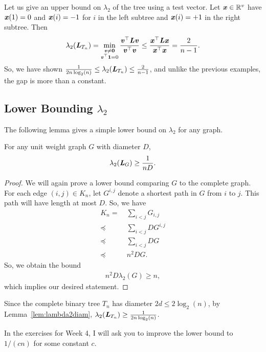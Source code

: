 Let us give an upper bound on $\lambda_2$ of the tree using a test vector.
Let $\boldsymbol{\mathit{x}} \in \mathbb{R}^v$ have $\boldsymbol{\mathit{x}}(1) = 0$ and $\boldsymbol{\mathit{x}}(i) = -1$ for $i$ in the left
subtree and $\boldsymbol{\mathit{x}}(i) = +1$ in the right subtree.
Then
\begin{align*}
\lambda_2(\boldsymbol{\mathit{L}}_{T_n}) = \min_{ \substack{ \boldsymbol{\mathit{v}} \neq \boldsymbol{0} \\ \boldsymbol{\mathit{v}}^\top
  \boldsymbol{1} = 0} } \frac{ \boldsymbol{\mathit{v}}^\top \boldsymbol{\mathit{L}} \boldsymbol{\mathit{v}}}{ \boldsymbol{\mathit{v}}^\top \boldsymbol{\mathit{v}}}
  \leq
  \frac{ \boldsymbol{\mathit{x}}^\top \boldsymbol{\mathit{L}} \boldsymbol{\mathit{x}}}{ \boldsymbol{\mathit{x}}^\top \boldsymbol{\mathit{x}}}
  =
  \frac{2}{n-1}.
\end{align*}
So, we have shown
$\frac{1}{2n\log_2(n)} \leq \lambda_2(\boldsymbol{\mathit{L}}_{T_n})
\leq \frac{2}{n-1}$, and unlike the previous examples, the gap is more than a constant.

\subsection{Lower Bounding $\lambda_2$}

The following lemma gives a simple lower bound on $\lambda_2$ for any graph.
\begin{lemma}
  \label{lem:lambda2diam}
  For any unit weight graph $G$ with diameter $D$,
  \[
    \lambda_2(\boldsymbol{\mathit{L}}_G) \geq \frac{1}{nD}.
    \]
\end{lemma}
\begin{proof}
  We will again prove a lower bound comparing $G$ to the complete
  graph. For each edge $(i,j) \in K_n$, let $G^{i,j}$ denote a
  shortest path in $G$ from $i$ to $j$. This path will have length at most $D$. So, we have
\begin{align*}
K_n
= & ~ \sum_{i < j} G_{i,j} \\
\preceq & ~ \sum_{i < j} D G^{i,j} \\
\preceq & ~ \sum_{i < j} D G \\
\preceq & ~ n^2 D G.
\end{align*}
So, we obtain the bound
\begin{align*}
n^2D \lambda_{2} (G) \geq n,
\end{align*}
which implies our desired statement.
\end{proof}

Since the complete binary tree $T_n$ has diameter $2d \leq 2\log_2(n)$,
by Lemma~\ref{lem:lambda2diam}, $\lambda_2(\boldsymbol{\mathit{L}}_{T_n}) \geq
\frac{1}{2n\log_2(n)}$. 

In the exercises for Week 4, I will ask you to improve the lower bound to
$1/(cn)$ for some constant $c$.



% 
% 



